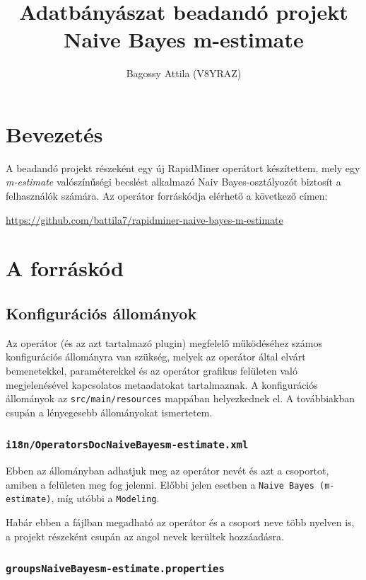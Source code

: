 \documentclass[a4paper]{article}
\title{Adatbányászat beadandó projekt \\  \vspace*{3pt} \large Naive Bayes m-estimate}
\author{Bagossy Attila (V8YRAZ)}
\begin{document}
\maketitle

\section{Bevezetés}

A beadandó projekt részeként egy új RapidMiner operátort készítettem, mely egy \textit{m-estimate} valószínűségi becslést alkalmazó Naiv Bayes-osztályozót biztosít a felhasználók számára. Az operátor forráskódja elérhető a következő címen:

\begin{center}
    \url{https://github.com/battila7/rapidminer-naive-bayes-m-estimate}
\end{center}

\section{A forráskód}

\subsection{Konfigurációs állományok}

Az operátor (és az azt tartalmazó plugin) megfelelő működéséhez számos konfigurációs állományra van szükség, melyek az operátor által elvárt bemenetekkel, paraméterekkel és az operátor grafikus felületen való megjelenésével kapcsolatos metaadatokat tartalmaznak. A konfigurációs állományok az \texttt{src/main/resources} mappában helyezkednek el. A továbbiakban csupán a lényegesebb állományokat ismertetem.

\subsubsection{\texttt{i18n/OperatorsDocNaiveBayesm-estimate.xml}}

Ebben az állományban adhatjuk meg az operátor nevét és azt a csoportot, amiben a felületen meg fog jelenni. Előbbi jelen esetben a \texttt{Naive Bayes (m-estimate)}, míg utóbbi a \texttt{Modeling}.

Habár ebben a fájlban megadható az operátor és a csoport neve több nyelven is, a projekt részeként csupán az angol nevek kerültek hozzáadásra.

\subsubsection{\texttt{groupsNaiveBayesm-estimate.properties}}
\end{document}

